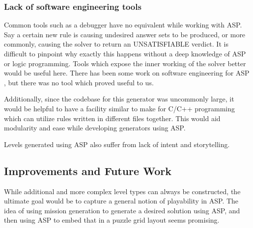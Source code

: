 \documentclass[letterpaper]{article}
\begin{document}
\subsubsection{Lack of software engineering tools}
Common tools such as a debugger have no equivalent while working with ASP. Say a certain new rule is causing undesired
answer sets to be produced, or more commonly, causing the solver to return an UNSATISFIABLE verdict. It is difficult to
pinpoint why exactly this happens without a deep knowledge of ASP or logic programming. Tools which expose the inner
working of the solver better would be useful here. There has been some work on software engineering for ASP
\cite{febbraro2011aspide}, but there was no tool which proved useful to us.

Additionally, since the codebase for this generator was uncommonly large, it would be helpful to have a facility similar
to make for C/C++ programming which can utilize rules written in different files together. This would aid modularity and
ease while developing generators using ASP.

Levels generated using ASP also suffer from lack of intent and storytelling.

\subsection{Improvements and Future Work}
While additional and more complex level types can always be constructed, the ultimate goal would be to capture a general
notion of playability in ASP. The idea of using mission generation to generate a desired solution using ASP, and then
using ASP to embed that in a puzzle grid layout seems promising.



\end{document}
